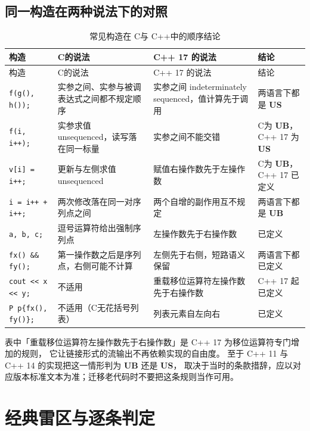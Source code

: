 \documentclass[12pt,a4paper,fontset=fandol]{ctexbook}
\newcommand{\Tp}[1]{\texttt{#1}}
\newcommand{\Lang}[1]{\textsf{#1}}
\newcommand{\CL}{\Lang{C}}
\newcommand{\CPP}{\Lang{C++}}
\newcommand{\UB}{\textbf{\textsf{UB}}}
\newcommand{\USB}{\textbf{\textsf{US}}}
\begin{document}
\subsection{同一构造在两种说法下的对照}\label{sec:ub08-c-vs-cxx}

\begin{longtable}{>{\raggedright\arraybackslash}p{} >{\raggedright\arraybackslash}p{} >{\raggedright\arraybackslash}p{} >{\raggedright\arraybackslash}p{}}
\caption{常见构造在 \CL 与 \CPP 中的顺序结论}\label{tab:ub08-c-vs-cxx}\\
\toprule
构造 & \CL 的说法 & \CPP{} 17 的说法 & 结论 \\
\midrule
\endfirsthead
\toprule
构造 & \CL 的说法 & \CPP{} 17 的说法 & 结论 \\
\midrule
\endhead
\bottomrule
\endfoot
\Tp{f(g(), h());} & 实参之间、实参与被调表达式之间都不规定顺序 & 实参之间 indeterminately sequenced，值计算先于调用 & 两语言下都是 \USB{} \\
\Tp{f(i, i++);} & 实参求值 unsequenced，读写落在同一标量 & 实参之间不能交错 & \CL 为 \UB{}，\CPP{} 17 为 \USB{} \\
\Tp{v[i] = i++;} & 更新与左侧求值 unsequenced & 赋值右操作数先于左操作数 & \CL 为 \UB{}，\CPP{} 17 已定义 \\
\Tp{i = i++ + i++;} & 两次修改落在同一对序列点之间 & 两个自增的副作用互不规定 & 两语言下都是 \UB{} \\
\Tp{a, b, c;} & 逗号运算符给出强制序列点 & 左操作数先于右操作数 & 已定义 \\
\Tp{fx() \&\& fy();} & 第一操作数之后是序列点，右侧可能不计算 & 左侧先于右侧，短路语义保留 & 两语言下都已定义 \\
\Tp{cout << x << y;} & 不适用 & 重载移位运算符左操作数先于右操作数 & \CPP{} 17 起已定义 \\
\Tp{P p\{fx(), fy()\};} & 不适用（\CL 无花括号列表） & 列表元素自左向右 & 已定义 \\
\end{longtable}

表中「重载移位运算符左操作数先于右操作数」是 \CPP{} 17 为移位运算符专门增加的规则，
它让链接形式的流输出不再依赖实现的自由度。
至于 \CPP{} 11 与 \CPP{} 14 的实现把这一情形判为 \UB{} 还是 \USB{}，
取决于当时的条款措辞，应以对应版本标准文本为准；迁移老代码时不要把这条规则当作可用。

\section{经典雷区与逐条判定}\label{sec:ub08-cases}
\end{document}
